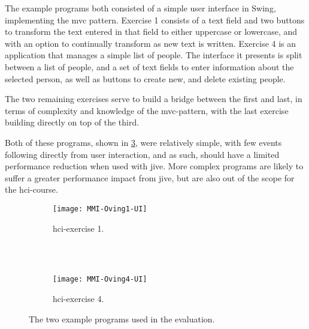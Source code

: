 The example programs both consisted of a simple user interface in Swing, implementing the \gls{mvc} pattern.
Exercise 1 consists of a text field and two buttons to transform the text entered in that field to either uppercase or lowercase, and with an option to continually transform as new text is written.
Exercise 4 is an application that manages a simple list of people.
The interface it presents is split between a list of people, and a set of text fields to enter information about the selected person, as well as buttons to create new, and delete existing people.

The two remaining exercises serve to build a bridge between the first and last, in terms of complexity and knowledge of the \gls{mvc}-pattern, with the last exercise building directly on top of the third.

Both of these programs, shown in \cref{fig:MMI-Oving-UI}, were relatively simple, with few events following directly from user interaction, and as such, should have a limited performance reduction when used with \gls{jive}.
More complex programs are likely to suffer a greater performance impact from \gls{jive}, but are also out of the scope for the \gls{hci}-course.

\begin{figure}[H]
	\centering
	\begin{subfigure}{\textwidth}
		\centering
		\texttt{[image: MMI-Oving1-UI]}
		\caption{\gls{hci}-exercise 1.}
		\label{fig:MMI-Oving1-UI}
	\end{subfigure}
	~\\
	~\\
	\begin{subfigure}{\textwidth}
		\centering
		\texttt{[image: MMI-Oving4-UI]}
		\caption{\gls{hci}-exercise 4.}
		\label{fig:MMI-Oving4-UI}
	\end{subfigure}
	\caption{The two example programs used in the evaluation.}
	\label{fig:MMI-Oving-UI}
\end{figure}


